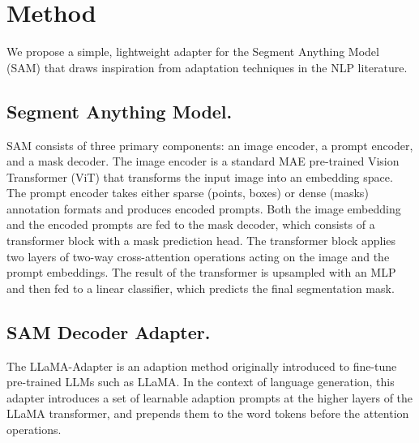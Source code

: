 \section{Method}
\label{sec:method}
We propose a simple, lightweight adapter for the Segment Anything Model (SAM) that draws inspiration from adaptation techniques in the NLP literature. 


\subsection{Segment Anything Model.}
\label{sec:sam}
SAM consists of three primary components: an image encoder, a prompt encoder, and a mask decoder. The image encoder is a standard MAE pre-trained Vision Transformer (ViT) that transforms the input image into an embedding space. The prompt encoder takes either sparse (points, boxes) or dense (masks) annotation formats and produces encoded prompts. Both the image embedding and the encoded prompts are fed to the mask decoder, which consists of a transformer block with a mask prediction head. The transformer block applies two layers of two-way cross-attention operations acting on the image and the prompt embeddings. The result of the transformer is upsampled with an MLP and then fed to a linear classifier, which predicts the final segmentation mask.

\subsection{SAM Decoder Adapter.}
\label{sec:adapter}

The LLaMA-Adapter is an adaption method originally introduced to fine-tune pre-trained LLMs such as LLaMA. In the context of language generation, this adapter introduces a set of learnable adaption prompts at the higher layers of the LLaMA transformer, and prepends them to the word tokens before the attention operations. 

